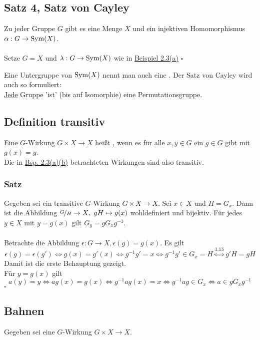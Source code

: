\subsection{Satz 4, Satz von Cayley}
\label{sub:satz_von_cayley}
Zu jeder Gruppe $G$ gibt es eine Menge $X$ und ein injektiven Homomorphismus $\alpha:G\to \operatorname{Sym}(X)$.\\

\\
Setze $G=X$ und $\lambda:G\to \operatorname{Sym}(X)$ wie in \hyperref[sub:bsp_wirkungen]{Beispiel 2.3(a)}
\hfill $\square$

Eine Untergruppe von $\operatorname{Sym}(X)$ nennt man auch eine . Der Satz von Cayley wird auch so formuliert:\\
\uline{Jede} Gruppe 'ist' (bis auf Isomorphie) eine Permutationsgruppe.

\subsection{Definition transitiv}
\label{sub:def_transitiv}
Eine $G$-Wirkung $G\times X\to X$ heißt , wenn es für alle $x,y\in G$ ein $g\in G$ gibt mit $g(x)=y$.\\
Die in \hyperref[sub:bsp_wirkungen]{Bsp. 2.3(a)(b)} betrachteten Wirkungen sind also transitiv.

\subsubsection*{Satz}
Gegeben sei ein transitive $G$-Wirkung $G\times X\to X$. Sei $x\in X$ und $H=G_x$. Dann ist die Abbildung $\nicefrac{G}{H}\to X,~gH\mapsto g(x)$ wohldefiniert und bijektiv. Für jedes $y\in X$ mit $y=g(x)$ gilt $G_y=gG_xg^{-1}$.\\

\\
Betrachte die Abbildung $\epsilon:G\to X,\epsilon(g)=g(x)$. Es gilt \[\epsilon(g)=\epsilon(g') \Leftrightarrow g(x)=g'(x) \Leftrightarrow g^{-1}g'=x \Leftrightarrow g^{-1}g'\in G_x=H \stackrel{\hyperref[sub:nebenklassen]{1.13}}{\Leftrightarrow} g'H=gH\]
Damit ist die erste Behauptung gezeigt.\\
Für $y=g(x)$ gilt \[a(y)=y \Leftrightarrow ag(x)=g(x) \Leftrightarrow g^{-1}ag(x)=x \Leftrightarrow g^{-1}ag\in G_x \Leftrightarrow a\in gG_xg^{-1}\]
\hfill $\square$

\subsection{Bahnen}
\label{sub:bahnen}
Gegeben sei eine $G$-Wirkung $G\times X\to X$.

